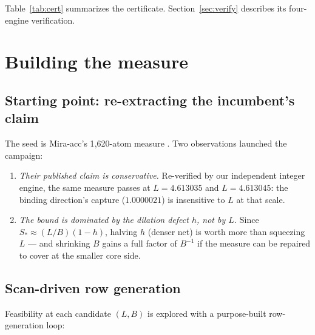 \documentclass[11pt]{article}
\theoremstyle{definition}
\theoremstyle{remark}
\begin{document}
Table~\ref{tab:cert} summarizes the certificate. Section~\ref{sec:verify}
describes its four-engine verification.

\section{Building the measure}

\subsection{Starting point: re-extracting the incumbent's claim}

The seed is Mira-acc's 1{,}620-atom measure \cite{Miraacc2026}. Two
observations launched the campaign:

\begin{enumerate}[label=(\roman*)]
\item \emph{Their published claim is conservative.} Re-verified by our
independent integer engine, the same measure passes at
$L=4.613035$ and $L=4.613045$: the binding direction's capture
($1.0000021$) is insensitive to $L$ at that scale.
\item \emph{The bound is dominated by the dilation defect $h$, not by
$L$.} Since $S_*\approx(L/B)(1-h)$, halving $h$ (denser net) is worth
more than squeezing $L$ --- and shrinking $B$ gains a full factor of
$B^{-1}$ if the measure can be repaired to cover at the smaller core
side.
\end{enumerate}

\subsection{Scan-driven row generation}

Feasibility at each candidate $(L,B)$ is explored with a purpose-built
row-generation loop:
\end{document}
